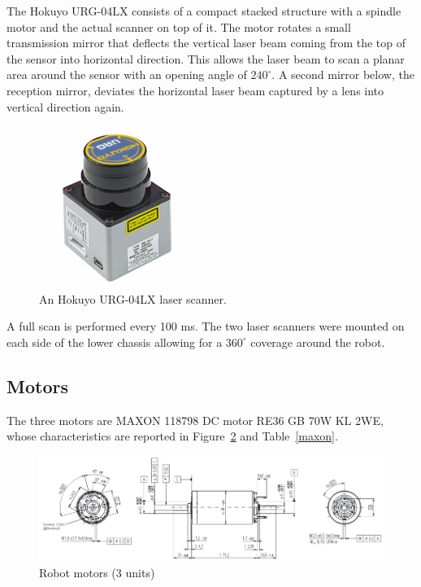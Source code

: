 The Hokuyo URG-04LX consists of a compact stacked structure with a spindle motor and the actual scanner on top of it. The motor rotates a small transmission mirror that deflects the vertical laser beam coming from the top of the sensor into horizontal direction. This allows the laser beam to scan a planar area around the sensor with an opening angle of $240^\circ$. A second mirror below, the reception mirror, deviates the horizontal laser beam captured by a lens into vertical direction again.

\begin{figure}[H]
	\centering
	\includegraphics[width=5cm]{images/03-foundation/hokuyo}
	\caption{ An Hokuyo URG-04LX laser scanner.}
	\label{fig:hokuyo} 
\end{figure}

A full scan is performed every 100 ms. The two laser scanners were mounted on each side of the lower chassis allowing for a $360^\circ$ coverage around the robot.

\subsection{Motors}
The three motors are MAXON 118798 DC motor RE36 GB 70W KL 2WE, whose characteristics are reported in Figure~\ref{motor} and Table~\ref{maxon}.

\begin{figure}[H]
	\centering
	\includegraphics[width=\textwidth]{images/03-foundation/motor}
	\caption{Robot motors (3 units)}
	\label{motor} 
\end{figure}

